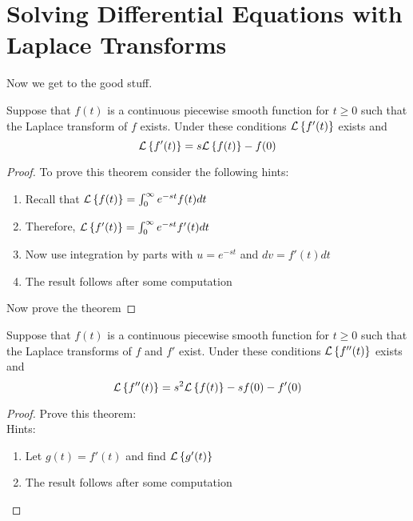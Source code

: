 \newpage\section{Solving Differential Equations with Laplace Transforms}
Now we get to the good stuff.
\begin{thm}
    Suppose that $f(t)$ is a continuous piecewise smooth function for $t \ge 0$ such that
    the Laplace transform of $f$ exists.  Under these conditions $\mathcal{L}\left\{ f'(t) \right\}$ exists and
    \[ \mathcal{L}\left\{ f'(t) \right\} = s \mathcal{L}\left\{ f(t) \right\} - f(0) \]
\end{thm}
\begin{proof}
    To prove this theorem consider the following hints:
    \begin{enumerate}
        \item Recall that $\mathcal{L}\left\{ f(t) \right\} = \int_0^\infty e^{-st} f(t) dt$
        \item Therefore, $\mathcal{L}\left\{ f'(t) \right\} = \int_0^\infty e^{-st} f'(t) dt$
        \item Now use integration by parts with $u=e^{-st}$ and $dv = f'(t) dt$
        \item The result follows after some computation
    \end{enumerate}
   Now prove the theorem
\end{proof}


\begin{thm}
    Suppose that $f(t)$ is a continuous piecewise smooth function for $t \ge 0$ such that
    the Laplace transforms of $f$ and $f'$ exist.  Under these conditions $\mathcal{L}\left\{ f''(t) \right\}$
    exists and
    \[ \mathcal{L}\left\{ f''(t) \right\} = s^2 \mathcal{L}\left\{ f(t) \right\} - sf(0) - f'(0) \]
\end{thm}
\begin{proof}
    Prove this theorem: \\
    Hints:
    \begin{enumerate}
        \item Let $g(t) = f'(t)$ and find $\mathcal{L}\left\{ g'(t) \right\}$
        \item The result follows after some computation
    \end{enumerate}
\end{proof}

